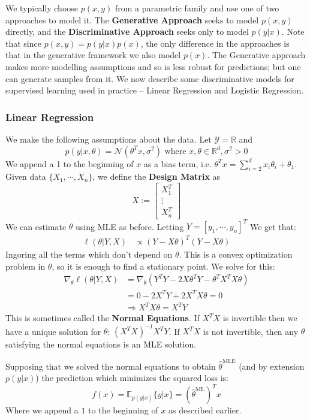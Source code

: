 \documentclass[]{article}
\theoremstyle{mattstyle}
\theoremstyle{definition}
\begin{document}
We typically choose $p(x,y)$ from a parametric family and use one of two approaches to model it. The \textbf{Generative Approach} seeks to model $p(x,y)$ directly, and the \textbf{Discriminative Approach} seeks only to model $p(y|x)$. Note that since $p(x,y)=p(y|x)p(x)$, the only difference in the approaches is that in the generative framework we also model $p(x)$. The Generative approach makes more modelling assumptions and so is less robust for predictions; but one can generate samples from it. We now describe some discriminative models for supervised learning used in practice -- Linear Regression and Logistic Regression.

\subsubsection{Linear Regression}

We make the following assumptions about the data. Let $\mathcal{Y} = \mathbb{R}$ and $$p(y|x, \theta) =\mathcal{N}(\theta^Tx,\sigma^2) \text{ where } x,\theta \in \mathbb{R}^d, \sigma^2 >0$$
We append a 1 to the beginning of $x$ as a bias term, i.e. $\theta^Tx = \sum_{i=2}^{d}x_i\theta_i + \theta_1$.
Given data $\{X_1, \cdots, X_n\}$, we define the \textbf{Design Matrix} as $$X:=\begin{bmatrix}
X_1^T \\
\vdots \\
X_n^T
\end{bmatrix}$$
We can estimate $\theta$ using MLE as before. Letting $Y=[y_1, \cdots, y_n]^T$ We get that:
\begin{align*}
\ell(\theta|Y,X) &\propto (Y - X\theta)^T(Y - X\theta)
\end{align*}
Ingoring all the terms which don't depend on $\theta$. This is a convex optimization problem in $\theta$, so it is enough to find a stationary point. We solve for this:
\begin{align*}
\nabla_{\theta} \ell(\theta|Y,X) &= \nabla_{\theta}\left( Y^TY - 2X\theta^TY - \theta^TX^TX\theta \right)\\
&= 0 - 2X^TY + 2X^TX\theta = 0\\
&\Rightarrow X^TX\theta = X^TY
\end{align*}
This is sometimes called the \textbf{Normal Equations}. If $X^TX$ is invertible then we have a unique solution for $\theta$: $ (X^TX)^{-1}X^TY$. If $X^TX$ is not invertible, then any $\theta$ satisfying the normal equations is an MLE solution.

Supposing that we solved the normal equations to obtain $\hat{\theta}^{\text{MLE}}$ (and by extension $p(y|x)$) the prediction which minimizes the squared loss is: $$f(x)=\mathbb{E}_{p(y|x)}\{y|x\}=(\hat{\theta}^{\text{ML}})^Tx$$
Where we append a $1$ to the beginning of $x$ as described earlier. 
\end{document}
